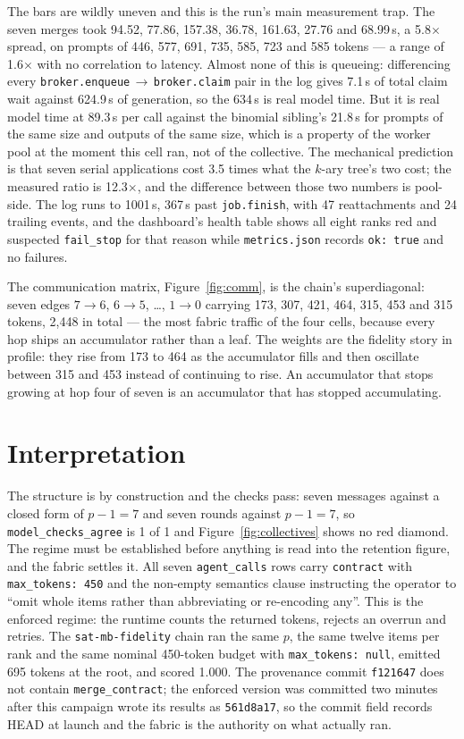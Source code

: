 \documentclass[11pt]{article}
\begin{document}
The bars are wildly uneven and this is the run's main measurement trap. The seven merges
took 94.52, 77.86, 157.38, 36.78, 161.63, 27.76 and 68.99\,s, a 5.8$\times$ spread, on
prompts of 446, 577, 691, 735, 585, 723 and 585 tokens --- a range of 1.6$\times$ with no
correlation to latency. Almost none of this is queueing: differencing every
\texttt{broker.enqueue}\,$\to$\,\texttt{broker.claim} pair in the log gives 7.1\,s of total
claim wait against 624.9\,s of generation, so the 634\,s is real model time. But it is
real model time at 89.3\,s per call against the binomial sibling's 21.8\,s for prompts of
the same size and outputs of the same size, which is a property of the worker pool at the
moment this cell ran, not of the collective. The mechanical prediction is that seven serial
applications cost 3.5 times what the $k$-ary tree's two cost; the measured ratio is
12.3$\times$, and the difference between those two numbers is pool-side. The log runs to
1001\,s, 367\,s past \texttt{job.finish}, with 47 reattachments and 24 trailing events, and
the dashboard's health table shows all eight ranks red and suspected \texttt{fail\_stop}
for that reason while \texttt{metrics.json} records \texttt{ok: true} and no failures.

The communication matrix, Figure~\ref{fig:comm}, is the chain's superdiagonal: seven edges
$7\!\to\!6$, $6\!\to\!5$, \dots, $1\!\to\!0$ carrying 173, 307, 421, 464, 315, 453 and 315
tokens, 2{,}448 in total --- the most fabric traffic of the four cells, because every hop
ships an accumulator rather than a leaf. The weights are the fidelity story in profile:
they rise from 173 to 464 as the accumulator fills and then oscillate between 315 and 453
instead of continuing to rise. An accumulator that stops growing at hop four of seven is
an accumulator that has stopped accumulating.

\section{Interpretation}

The structure is by construction and the checks pass: seven messages against a closed form
of $p-1=7$ and seven rounds against $p-1=7$, so \texttt{model\_checks\_agree} is 1 of 1
and Figure~\ref{fig:collectives} shows no red diamond. The regime must be established
before anything is read into the retention figure, and the fabric settles it. All seven
\texttt{agent\_calls} rows carry \texttt{contract} with \texttt{max\_tokens: 450} and the
non-empty semantics clause instructing the operator to ``omit whole items rather than
abbreviating or re-encoding any''. This is the enforced regime: the runtime counts the
returned tokens, rejects an overrun and retries. The \texttt{sat-mb-fidelity} chain ran the
same $p$, the same twelve items per rank and the same nominal 450-token budget with
\texttt{max\_tokens: null}, emitted 695 tokens at the root, and scored 1.000. The
provenance commit \texttt{f121647} does not contain \texttt{merge\_contract}; the enforced
version was committed two minutes after this campaign wrote its results as
\texttt{561d8a17}, so the commit field records HEAD at launch and the fabric is the
authority on what actually ran.
\end{document}
